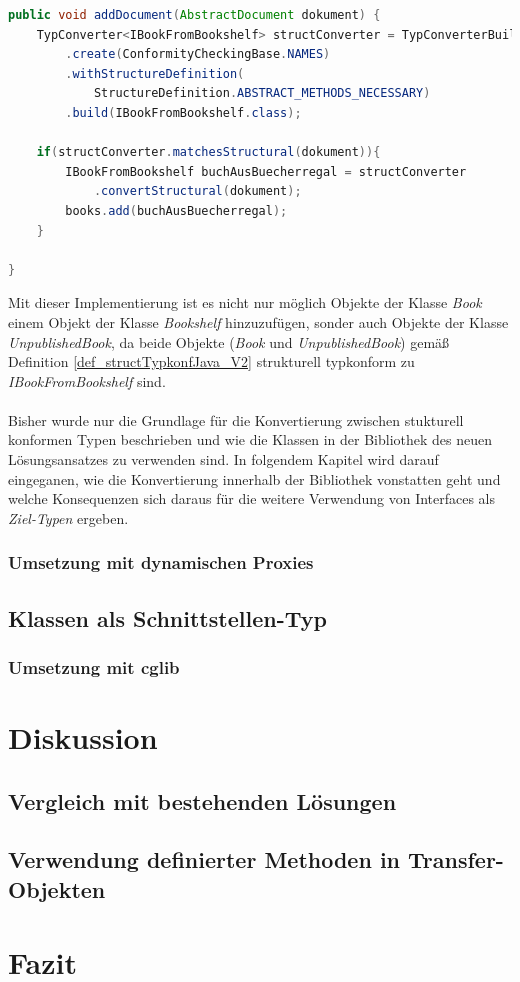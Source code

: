 \documentclass[11pt, 
ngerman,
doublespacing,
chapterinoneline, %
consistentlayout, %
]{scrartcl}
\begin{document}
\begin{lstlisting}[language=Java, label=ls_insertBook2, caption=addDocument]
public void addDocument(AbstractDocument dokument) {
	TypConverter<IBookFromBookshelf> structConverter = TypConverterBuilder
		.create(ConformityCheckingBase.NAMES)
		.withStructureDefinition(
			StructureDefinition.ABSTRACT_METHODS_NECESSARY)
		.build(IBookFromBookshelf.class);

	if(structConverter.matchesStructural(dokument)){
		IBookFromBookshelf buchAusBuecherregal = structConverter
			.convertStructural(dokument);
		books.add(buchAusBuecherregal);
	}	
	
}
\end{lstlisting}
Mit dieser Implementierung ist es nicht nur möglich Objekte der Klasse \emph{Book} einem Objekt der Klasse \emph{Bookshelf} hinzuzufügen, sonder auch Objekte der Klasse \linebreak\emph{UnpublishedBook}, da beide Objekte (\emph{Book} und \emph{UnpublishedBook}) gemäß Definition \ref{def_structTypkonfJava_V2} strukturell typkonform zu \emph{IBookFromBookshelf} sind.\\\\
Bisher wurde nur die Grundlage für die Konvertierung zwischen stukturell konformen Typen beschrieben und wie die Klassen in der Bibliothek des neuen Lösungsansatzes zu verwenden sind. In folgendem Kapitel wird darauf eingeganen, wie die Konvertierung innerhalb der Bibliothek vonstatten geht und welche Konsequenzen sich daraus für die weitere Verwendung von Interfaces als \emph{Ziel-Typen} ergeben.
\subsubsection{Umsetzung mit dynamischen Proxies}

\cite{proxy}
\subsection{Klassen als Schnittstellen-Typ}\label{sec_classes}
\subsubsection{Umsetzung mit cglib}
\cite{cglib}
\section{Diskussion}
\subsection{Vergleich mit bestehenden Lösungen}
\subsection{Verwendung definierter Methoden in Transfer-Objekten}
\section{Fazit}

{}

\nocite{*}
\end{document}
